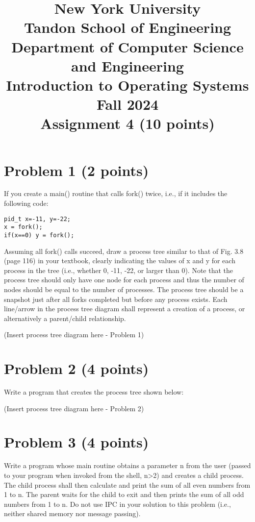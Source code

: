 \documentclass{article}
\begin{document}
\title{New York University \\ Tandon School of Engineering \\ Department of Computer Science and Engineering \\ Introduction to Operating Systems \\ Fall 2024 \\ Assignment 4 (10 points)}
\maketitle

\section*{Problem 1 (2 points)}

If you create a main() routine that calls fork() twice, i.e., if it includes the following code:

\texttt{pid\_t x=-11, y=-22; \\
x = fork(); \\
if(x==0) y = fork();}

Assuming all fork() calls succeed, draw a process tree similar to that of Fig. 3.8 (page 116) in your textbook, clearly indicating the values of x and y for each process in the tree (i.e., whether 0, -11, -22, or larger than 0). Note that the process tree should only have one node for each process and thus the number of nodes should be equal to the number of processes. The process tree should be a snapshot just after all forks completed but before any process exists. Each line/arrow in the process tree diagram shall represent a creation of a process, or alternatively a parent/child relationship.

(Insert process tree diagram here - Problem 1)


\section*{Problem 2 (4 points)}

Write a program that creates the process tree shown below:

(Insert process tree diagram here - Problem 2)


\section*{Problem 3 (4 points)}

Write a program whose main routine obtains a parameter n from the user (passed to your program when invoked from the shell, n>2) and creates a child process. The child process shall then calculate and print the sum of all even numbers from 1 to n. The parent waits for the child to exit and then prints the sum of all odd numbers from 1 to n. Do not use IPC in your solution to this problem (i.e., neither shared memory nor message passing).
\end{document}
